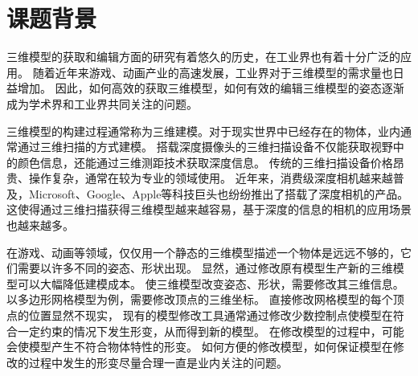 
\section{课题背景}
三维模型的获取和编辑方面的研究有着悠久的历史，在工业界也有着十分广泛的应用。
随着近年来游戏、动画产业的高速发展，工业界对于三维模型的需求量也日益增加。
因此，如何高效的获取三维模型，如何有效的编辑三维模型的姿态逐渐成为学术界和工业界共同关注的问题。

三维模型的构建过程通常称为三维建模。对于现实世界中已经存在的物体，业内通常通过三维扫描的方式建模。
搭载深度摄像头的三维扫描设备不仅能获取视野中的颜色信息，还能通过三维测距技术获取深度信息。
传统的三维扫描设备价格昂贵、操作复杂，通常在较为专业的领域使用。
近年来，消费级深度相机越来越普及，Microsoft、Google、Apple等科技巨头也纷纷推出了搭载了深度相机的产品。
这使得通过三维扫描获得三维模型越来越容易，基于深度的信息的相机的应用场景也越来越多。

在游戏、动画等领域，仅仅用一个静态的三维模型描述一个物体是远远不够的，它们需要以许多不同的姿态、形状出现。
显然，通过修改原有模型生产新的三维模型可以大幅降低建模成本。
使三维模型改变姿态、形状，需要修改其三维信息。以多边形网格模型为例，需要修改顶点的三维坐标。
直接修改网格模型的每个顶点的位置显然不现实，
现有的模型修改工具通常通过修改少数控制点使模型在符合一定约束的情况下发生形变，从而得到新的模型。
在修改模型的过程中，可能会使模型产生不符合物体特性的形变。
如何方便的修改模型，如何保证模型在修改的过程中发生的形变尽量合理一直是业内关注的问题。